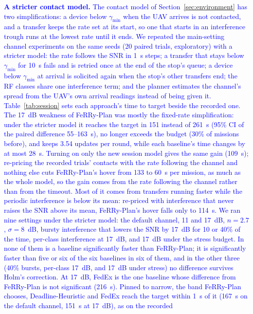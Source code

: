 \documentclass[conference]{IEEEtran}
\newcommand{\sysname}{FeRRy}
\begin{document}
\textcolor{blue}{\textbf{A stricter contact model.} The contact model of
Section~\ref{sec:environment} has two simplifications: a device below
$\gamma_{\min}$ when the UAV arrives is not contacted, and a transfer keeps the
rate set at its start, so one that starts in an interference trough runs at the
lowest rate until it ends. We repeated the main-setting channel experiments on
the same seeds (20 paired trials, exploratory) with a stricter model: the rate
follows the SNR in 1~s steps; a transfer that stays below $\gamma_{\min}$ for
10~s fails and is retried once at the end of the stop's queue; a device below
$\gamma_{\min}$ at arrival is solicited again when the stop's other transfers
end; the RF classes share one interference term; and the planner estimates the
channel's spread from the UAV's own arrival readings instead of being given it.
Table~\ref{tab:session} sets each approach's time to target beside the recorded
one. The 17~dB weakness of \sysname{}-Plan was mostly the fixed-rate
simplification: under the stricter model it reaches the target in 151 instead
of 261~s (95\% CI of the paired difference 55--163~s), no longer exceeds the
budget (30\% of missions before), and keeps 3.54 updates per round, while each
baseline's time changes by at most 28~s. Turning on only the new session model
gives the same gain (109~s); re-pricing the recorded trials' contacts with the
rate following the channel and nothing else cuts \sysname{}-Plan's hover from
133 to 60~s per mission, as much as the whole model, so the gain comes from the
rate following the channel rather than from the timeout. Most of it comes from
transfers running faster while the periodic interference is below its mean:
re-priced with interference that never raises the SNR above its mean,
\sysname{}-Plan's hover falls only to 114~s. We ran nine settings under the
stricter model: the
default channel, 11 and 17~dB, $n=2.7$, $\sigma=8$~dB, bursty interference that
lowers the SNR by 17~dB for 10 or 40\% of the time, per-class interference at
17~dB, and 17~dB under the stress budget. In none of them is a baseline
significantly faster than \sysname{}-Plan; it is significantly faster than five
or six of the six baselines in six of them, and in the other three (40\%
bursts, per-class 17~dB, and 17~dB under stress) no difference survives Holm's
correction. At 17~dB, FedEx is the one baseline whose difference from
\sysname{}-Plan is not significant (216~s). Pinned to narrow, the band
\sysname{}-Plan chooses, Deadline-Heuristic and FedEx reach the target within
1~s of it (167~s on the default channel, 151~s at 17~dB), as on the recorded
}
\end{document}
